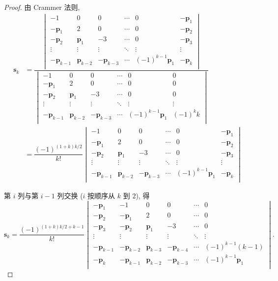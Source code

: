 \documentclass[UTF8]{ctexart}
\begin{document}
\begin{proof}
    由 Crammer 法则,
    \begin{align*}
        \mathbf{s}_k & =\dfrac{\begin{vmatrix}
            -1 & 0 & 0 & \cdots & 0 & -\mathbf{p}_1 \\
            -\mathbf{p}_1 & 2 & 0 & \cdots & 0 & -\mathbf{p}_2 \\
            -\mathbf{p}_2 & \mathbf{p}_1 & -3 & \cdots & 0 & -\mathbf{p}_3 \\
            \vdots & \vdots & \vdots & \ddots & \vdots & \vdots \\
            -\mathbf{p}_{k-1} & \mathbf{p}_{k-2} & -\mathbf{p}_{k-3} & \cdots & (-1)^{k-1}\mathbf{p}_1 & -\mathbf{p}_k \\
        \end{vmatrix}}{\begin{vmatrix}
            -1 & 0 & 0 & \cdots & 0 & 0 \\
            -\mathbf{p}_1 & 2 & 0 & \cdots & 0 & 0 \\
            -\mathbf{p}_2 & \mathbf{p}_1 & -3 & \cdots & 0 & 0 \\
            \vdots & \vdots & \vdots & \ddots & \vdots & \vdots \\
            -\mathbf{p}_{k-1} & \mathbf{p}_{k-2} & -\mathbf{p}_{k-3} & \cdots & (-1)^{k-1}\mathbf{p}_1 & (-1)^kk \\
        \end{vmatrix}} \\
        & =\dfrac{(-1)^{(1+k)k/2}}{k!}\begin{vmatrix}
            -1 & 0 & 0 & \cdots & 0 & -\mathbf{p}_1 \\
            -\mathbf{p}_1 & 2 & 0 & \cdots & 0 & -\mathbf{p}_2 \\
            -\mathbf{p}_2 & \mathbf{p}_1 & -3 & \cdots & 0 & -\mathbf{p}_3 \\
            \vdots & \vdots & \vdots & \ddots & \vdots & \vdots \\
            -\mathbf{p}_{k-1} & \mathbf{p}_{k-2} & -\mathbf{p}_{k-3} & \cdots & (-1)^{k-1}\mathbf{p}_1 & -\mathbf{p}_k \\
        \end{vmatrix}
    \end{align*}

    第 $i$ 列与第 $i-1$ 列交换 ($i$ 按顺序从 $k$ 到 $2$), 得
    \[\mathbf{s}_k=\dfrac{(-1)^{(1+k)k/2+k-1}}{k!}\begin{vmatrix}
        -\mathbf{p}_1 & -1 & 0 & 0 & \cdots & 0 \\
        -\mathbf{p}_2 & -\mathbf{p}_1 & 2 & 0 & \cdots & 0 \\
        -\mathbf{p}_3 & -\mathbf{p}_2 & \mathbf{p}_1 & -3 & \cdots & 0 \\
        \vdots & \vdots & \vdots & \vdots & \ddots & \vdots \\
        -\mathbf{p}_{k-1} & -\mathbf{p}_{k-2} & \mathbf{p}_{k-3} & -\mathbf{p}_{k-4} & \cdots & (-1)^{k-1}(k-1) \\
        -\mathbf{p}_k & -\mathbf{p}_{k-1} & \mathbf{p}_{k-2} & -\mathbf{p}_{k-3} & \cdots & (-1)^{k-1}\mathbf{p}_1 \\
    \end{vmatrix}.\]


\end{proof}
\end{document}
